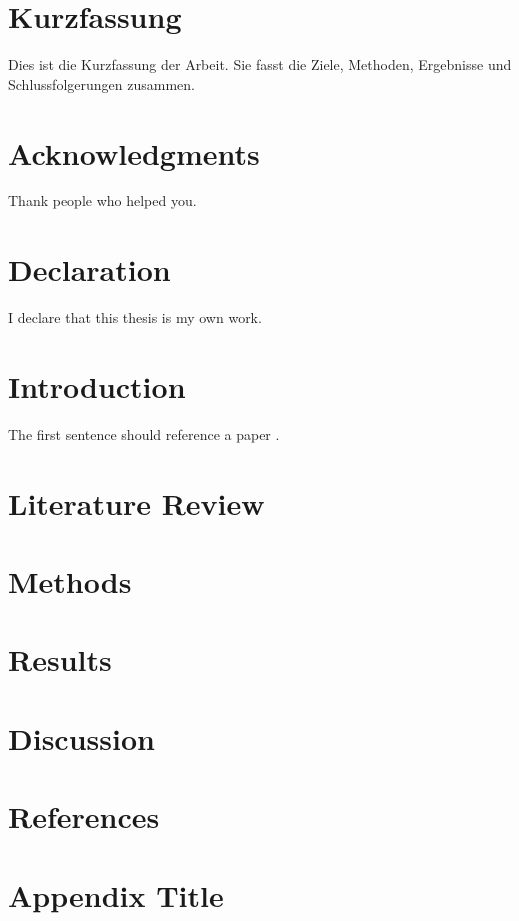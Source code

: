 \documentclass[man]{apa7}
\begin{document}
\maketitlepage

\newpage
\begin{abstract}
This is the abstract section. Replace with your own text (max ~250 words).
\vspace{2mm}
\noindent\textbf{Keywords:} \textit{Keyword1, Keyword2}
\vspace{5mm}
\end{abstract}

\newpage
\section*{Kurzfassung}
Dies ist die Kurzfassung der Arbeit. Sie fasst die Ziele, Methoden, Ergebnisse und Schlussfolgerungen zusammen.

\newpage
\section*{Acknowledgments}
Thank people who helped you.

\newpage
\section*{Declaration}
I declare that this thesis is my own work.

\newpage
\tableofcontents
\listoffigures
\listoftables
\newpage

\newpage
\section{Introduction}
The first sentence should reference a paper \cite{Fink2021}.
\lipsum[1-4]

\section{Literature Review}
\lipsum[5-8]

\section{Methods}
\lipsum[9-12]

\section{Results}
\lipsum[13-16]

\section{Discussion}
\lipsum[17-20]

\newpage
\section*{References}
\printbibliography

\appendix
\section{Appendix Title}
\lipsum[21-23]
\end{document}
